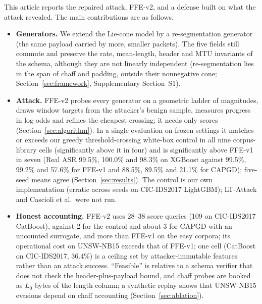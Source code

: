This article reports the repaired attack, FFE-v2, and a defense built on what the attack revealed. The main contributions are as follows.
\begin{itemize}
    \item \textbf{Generators.} We extend the Lie-cone model by a re-segmentation generator (the same payload carried by more, smaller packets). The five fields still commute and preserve the rate, mean-length, header and MTU invariants of the schema, although they are not linearly independent (re-segmentation lies in the span of chaff and padding, outside their nonnegative cone; Section~\ref{sec:framework}, Supplementary Section~S1).
    \item \textbf{Attack.} FFE-v2 probes every generator on a geometric ladder of magnitudes, draws window targets from the attacker's benign sample, measures progress in log-odds and refines the cheapest crossing; it needs only scores (Section~\ref{sec:algorithm}). In a single evaluation on frozen settings it matches or exceeds our greedy threshold-crossing white-box control in all nine corpus-library cells (significantly above it in four) and is significantly above FFE-v1 in seven (Real ASR 99.5\%, 100.0\% and 98.3\% on XGBoost against 99.5\%, 99.2\% and 57.6\% for FFE-v1 and 88.5\%, 89.5\% and 21.1\% for CAPGD); five-seed means agree (Section~\ref{sec:results}). The control is our own implementation (erratic across seeds on CIC-IDS2017 LightGBM); LT-Attack and Cascioli et al.\ were not run.
    \item \textbf{Honest accounting.} FFE-v2 uses 28--38 score queries (109 on CIC-IDS2017 CatBoost), against 2 for the control and about 3 for CAPGD with an uncounted surrogate, and more than FFE-v1 on the easy corpora; its operational cost on UNSW-NB15 exceeds that of FFE-v1; one cell (CatBoost on CIC-IDS2017, 36.4\%) is a ceiling set by attacker-immutable features rather than an attack success. ``Feasible'' is relative to a schema verifier that does not check the header-plus-payload bound, and chaff probes are booked as $L_0$ bytes of the length column; a synthetic replay shows that UNSW-NB15 evasions depend on chaff accounting (Section~\ref{sec:ablation}).

\end{itemize}
